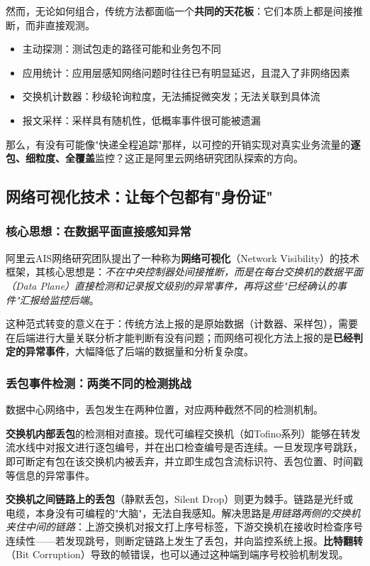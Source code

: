 然而，无论如何组合，传统方法都面临一个\textbf{共同的天花板}：它们本质上都是间接推断，而非直接观测。

\begin{itemize}
    \item 主动探测：测试包走的路径可能和业务包不同
    \item 应用统计：应用层感知网络问题时往往已有明显延迟，且混入了非网络因素
    \item 交换机计数器：秒级轮询粒度，无法捕捉微突发；无法关联到具体流
    \item 报文采样：采样具有随机性，低概率事件很可能被遗漏
\end{itemize}

那么，有没有可能像"快递全程追踪"那样，以可控的开销实现对真实业务流量的\textbf{逐包、细粒度、全覆盖}监控？这正是阿里云网络研究团队探索的方向。

\subsection{网络可视化技术：让每个包都有"身份证"}

\subsubsection{核心思想：在数据平面直接感知异常}

阿里云AIS网络研究团队提出了一种称为\textbf{网络可视化}（Network Visibility）的技术框架，其核心思想是：\emph{不在中央控制器处间接推断，而是在每台交换机的数据平面（Data Plane）直接检测和记录报文级别的异常事件，再将这些"已经确认的事件"汇报给监控后端}。

这种范式转变的意义在于：传统方法上报的是原始数据（计数器、采样包），需要在后端进行大量关联分析才能判断有没有问题；而网络可视化方法上报的是\textbf{已经判定的异常事件}，大幅降低了后端的数据量和分析复杂度。

\subsubsection{丢包事件检测：两类不同的检测挑战}

数据中心网络中，丢包发生在两种位置，对应两种截然不同的检测机制。

\textbf{交换机内部丢包}的检测相对直接。现代可编程交换机（如Tofino系列）能够在转发流水线中对报文进行逐包编号，并在出口检查编号是否连续。一旦发现序号跳跃，即可断定有包在该交换机内被丢弃，并立即生成包含流标识符、丢包位置、时间戳等信息的异常事件。

\textbf{交换机之间链路上的丢包}（静默丢包，Silent Drop）则更为棘手。链路是光纤或电缆，本身没有可编程的"大脑"，无法自我感知。解决思路是\emph{用链路两侧的交换机夹住中间的链路}：上游交换机对报文打上序号标签，下游交换机在接收时检查序号连续性——若发现跳号，则断定链路上发生了丢包，并向监控系统上报。\textbf{比特翻转}（Bit Corruption）导致的帧错误，也可以通过这种端到端序号校验机制发现。

